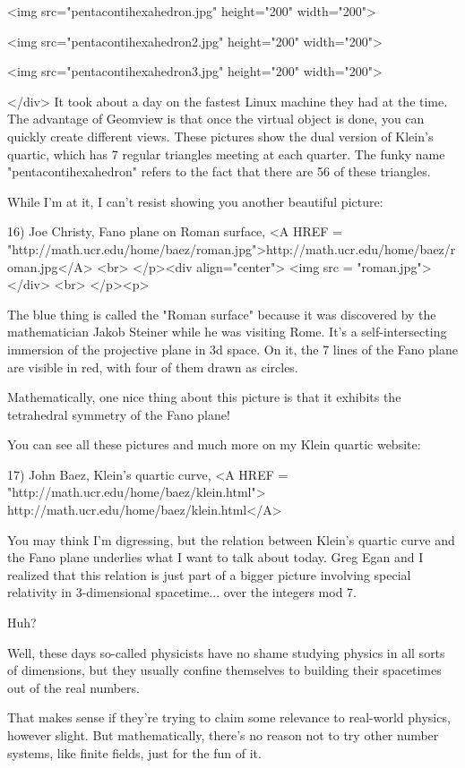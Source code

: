 <img src="pentacontihexahedron.jpg" height="200" width="200">


<img src="pentacontihexahedron2.jpg" height="200" width="200">


<img src="pentacontihexahedron3.jpg" height="200" width="200">


</div>
It took about a day on the fastest Linux machine they had at the time.  The 
advantage of Geomview is that once the virtual object is done, you can 
quickly create different views.  These pictures show the dual version of 
Klein's quartic, which has 7 regular triangles meeting at each quarter.  
The funky name "pentacontihexahedron" 
refers to the fact that there are 56
of these triangles.

While I'm at it, I can't resist showing you another beautiful picture: 

16) Joe Christy, Fano plane on Roman surface, 
    <A HREF = 
"http://math.ucr.edu/home/baez/roman.jpg">http://math.ucr.edu/home/baez/roman.jpg</A>
<br>
</p><div align="center">
<img src = "roman.jpg">
</div>
<br>
</p><p>

The blue thing is called the "Roman surface" 
because it was discovered 
by the mathematician Jakob Steiner while he was visiting Rome.  It's a 
self-intersecting immersion of the projective plane in 3d space.  On it, 
the 7 lines of the Fano plane are visible in red, with four of them drawn 
as circles.  

Mathematically, one nice thing about this picture is that it exhibits the 
tetrahedral symmetry of the Fano plane!  

You can see all these pictures and much more on my Klein quartic website:

17) John Baez, Klein's quartic curve, <A HREF = 
"http://math.ucr.edu/home/baez/klein.html">
http://math.ucr.edu/home/baez/klein.html</A>

You may think I'm digressing, but the relation between Klein's quartic curve and 
the Fano plane underlies what I want to talk about today.  Greg Egan and I 
realized that this relation is just part of a bigger picture involving special 
relativity in 3-dimensional spacetime... over the integers mod 7.

Huh?

Well, these days so-called physicists have no shame studying physics in all sorts 
of dimensions, but they usually confine themselves to building their spacetimes 
out of the real numbers.

That makes sense if they're trying to claim some relevance to real-world physics,
however slight.   But mathematically, there's no reason not to try other number 
systems, like finite fields, just for the fun of it.  

